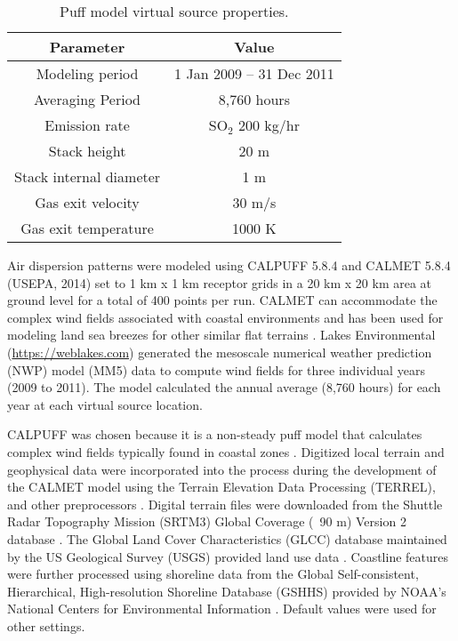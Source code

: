 \begin{table}[H]
\centering
\caption{Puff model virtual source properties.}
\label{tb:puffmodel}
\begin{tabular}{@{}cc@{}}
\toprule
\textbf{Parameter}      & \textbf{Value}           \\ \midrule
Modeling period         & 1 Jan 2009 – 31 Dec 2011 \\
Averaging Period        & 8,760 hours              \\
Emission rate           & SO$_{2}$ 200 kg/hr       \\
Stack height            & 20 m                     \\
Stack internal diameter & 1 m                      \\
Gas exit velocity       & 30 m/s                   \\
Gas exit temperature    & 1000 K                   \\ \bottomrule
\end{tabular}
\end{table}

Air dispersion patterns were modeled using CALPUFF 5.8.4 and CALMET 5.8.4  (USEPA, 2014) set to 1 km x 1 km receptor grids in a 20 km x 20 km area at ground level for a total of 400 points per run.  CALMET can accommodate the complex wind fields associated with coastal environments and has been used for modeling land sea breezes for other similar flat terrains \citep{Mangia2010}. Lakes Environmental (\url{https://weblakes.com}) generated the mesoscale numerical weather prediction (NWP) model (MM5) data to compute wind fields for three individual years (2009 to 2011).  The model calculated the annual average (8,760 hours) for each year at each virtual source location. 

CALPUFF was chosen because it is a non-steady puff model that calculates complex wind fields typically found in coastal zones \citep{Ghannam2013a, Indumati2009, USEPA2014, Weiss2014}.  Digitized local terrain and geophysical data were incorporated into the process during the development of the CALMET model using the Terrain Elevation Data Processing (TERREL), and other preprocessors \citep{Scire2000}.  Digital terrain files were downloaded from the Shuttle Radar Topography Mission (SRTM3) Global Coverage (~90 m) Version 2 database \citep{USGS2000}.  The Global Land Cover Characteristics (GLCC) database maintained by the US Geological Survey (USGS) provided land use data \citep{USGS2008}.  Coastline features were further processed using shoreline data from the Global Self-consistent, Hierarchical, High-resolution Shoreline Database (GSHHS) provided by NOAA's National Centers for Environmental Information \citep{NOAA2015}.  Default values were used for other settings.

